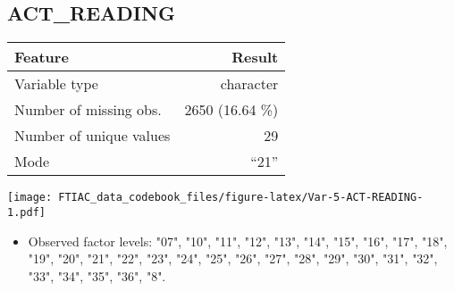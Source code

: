 \documentclass[]{article}
\providecommand{\tightlist}{%
  \setlength{\itemsep}{0pt}\setlength{\parskip}{0pt}}
\newcommand{\bminione}{\begin{minipage}{0.75 \textwidth}}
\newcommand{\bminitwo}{\begin{minipage}{0.25 \textwidth}}
\newcommand{\emini}{\end{minipage}}
\begin{document}
\hypertarget{act_reading}{\subsection{ACT\_READING}\label{act_reading}}

\bminione

\begin{longtable}[]{@{}lr@{}}
\toprule
\begin{minipage}[b]{0.34\columnwidth}\raggedright\strut
Feature\strut
\end{minipage} & \begin{minipage}[b]{0.21\columnwidth}\raggedleft\strut
Result\strut
\end{minipage}\tabularnewline
\midrule
\endhead
\begin{minipage}[t]{0.34\columnwidth}\raggedright\strut
Variable type\strut
\end{minipage} & \begin{minipage}[t]{0.21\columnwidth}\raggedleft\strut
character\strut
\end{minipage}\tabularnewline
\begin{minipage}[t]{0.34\columnwidth}\raggedright\strut
Number of missing obs.\strut
\end{minipage} & \begin{minipage}[t]{0.21\columnwidth}\raggedleft\strut
2650 (16.64 \%)\strut
\end{minipage}\tabularnewline
\begin{minipage}[t]{0.34\columnwidth}\raggedright\strut
Number of unique values\strut
\end{minipage} & \begin{minipage}[t]{0.21\columnwidth}\raggedleft\strut
29\strut
\end{minipage}\tabularnewline
\begin{minipage}[t]{0.34\columnwidth}\raggedright\strut
Mode\strut
\end{minipage} & \begin{minipage}[t]{0.21\columnwidth}\raggedleft\strut
``21''\strut
\end{minipage}\tabularnewline
\bottomrule
\end{longtable}

\emini
\bminitwo
\texttt{[image: FTIAC\_data\_codebook\_files/figure-latex/Var-5-ACT-READING-1.pdf]}
\emini

\begin{itemize}
\tightlist
\item
  Observed factor levels: "07", "10", "11", "12", "13", "14", "15",
  "16", "17", "18", "19", "20", "21", "22", "23", "24", "25", "26",
  "27", "28", "29", "30", "31", "32", "33", "34", "35", "36", "8".
\end{itemize}
\end{document}
